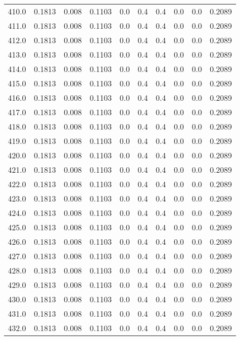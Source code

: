 \begin{longtable}{lrrrrrrrrr}
410.0 & 0.1813 & 0.008 & 0.1103 & 0.0 & 0.4 & 0.4 & 0.0 & 0.0 & 0.2089 \\
411.0 & 0.1813 & 0.008 & 0.1103 & 0.0 & 0.4 & 0.4 & 0.0 & 0.0 & 0.2089 \\
412.0 & 0.1813 & 0.008 & 0.1103 & 0.0 & 0.4 & 0.4 & 0.0 & 0.0 & 0.2089 \\
413.0 & 0.1813 & 0.008 & 0.1103 & 0.0 & 0.4 & 0.4 & 0.0 & 0.0 & 0.2089 \\
414.0 & 0.1813 & 0.008 & 0.1103 & 0.0 & 0.4 & 0.4 & 0.0 & 0.0 & 0.2089 \\
415.0 & 0.1813 & 0.008 & 0.1103 & 0.0 & 0.4 & 0.4 & 0.0 & 0.0 & 0.2089 \\
416.0 & 0.1813 & 0.008 & 0.1103 & 0.0 & 0.4 & 0.4 & 0.0 & 0.0 & 0.2089 \\
417.0 & 0.1813 & 0.008 & 0.1103 & 0.0 & 0.4 & 0.4 & 0.0 & 0.0 & 0.2089 \\
418.0 & 0.1813 & 0.008 & 0.1103 & 0.0 & 0.4 & 0.4 & 0.0 & 0.0 & 0.2089 \\
419.0 & 0.1813 & 0.008 & 0.1103 & 0.0 & 0.4 & 0.4 & 0.0 & 0.0 & 0.2089 \\
420.0 & 0.1813 & 0.008 & 0.1103 & 0.0 & 0.4 & 0.4 & 0.0 & 0.0 & 0.2089 \\
421.0 & 0.1813 & 0.008 & 0.1103 & 0.0 & 0.4 & 0.4 & 0.0 & 0.0 & 0.2089 \\
422.0 & 0.1813 & 0.008 & 0.1103 & 0.0 & 0.4 & 0.4 & 0.0 & 0.0 & 0.2089 \\
423.0 & 0.1813 & 0.008 & 0.1103 & 0.0 & 0.4 & 0.4 & 0.0 & 0.0 & 0.2089 \\
424.0 & 0.1813 & 0.008 & 0.1103 & 0.0 & 0.4 & 0.4 & 0.0 & 0.0 & 0.2089 \\
425.0 & 0.1813 & 0.008 & 0.1103 & 0.0 & 0.4 & 0.4 & 0.0 & 0.0 & 0.2089 \\
426.0 & 0.1813 & 0.008 & 0.1103 & 0.0 & 0.4 & 0.4 & 0.0 & 0.0 & 0.2089 \\
427.0 & 0.1813 & 0.008 & 0.1103 & 0.0 & 0.4 & 0.4 & 0.0 & 0.0 & 0.2089 \\
428.0 & 0.1813 & 0.008 & 0.1103 & 0.0 & 0.4 & 0.4 & 0.0 & 0.0 & 0.2089 \\
429.0 & 0.1813 & 0.008 & 0.1103 & 0.0 & 0.4 & 0.4 & 0.0 & 0.0 & 0.2089 \\
430.0 & 0.1813 & 0.008 & 0.1103 & 0.0 & 0.4 & 0.4 & 0.0 & 0.0 & 0.2089 \\
431.0 & 0.1813 & 0.008 & 0.1103 & 0.0 & 0.4 & 0.4 & 0.0 & 0.0 & 0.2089 \\
432.0 & 0.1813 & 0.008 & 0.1103 & 0.0 & 0.4 & 0.4 & 0.0 & 0.0 & 0.2089 \\

\end{longtable}
